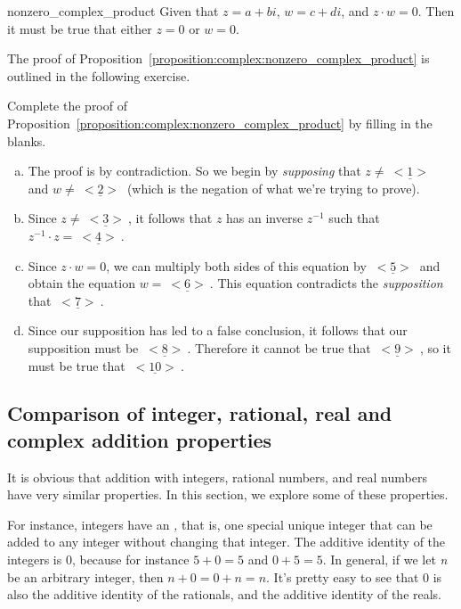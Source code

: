 \begin{prop}{nonzero_complex_product}
Given that $z = a+bi$, $w=c+di$, and $z \cdot w = 0$. Then it must be true that either $z=0$ or $w=0$.
\end{prop}
The proof of Proposition~\ref{proposition:complex:nonzero_complex_product} is outlined in the following exercise.

\begin{exercise}{12}
Complete the proof of Proposition~\ref{proposition:complex:nonzero_complex_product} by filling in the blanks.

\begin{enumerate}[(a)]
\item The proof is by contradiction. So we begin by \emph{supposing} that $z \neq  \underline{~<1>~}$  and $w \neq  \underline{~<2>~}$ (which is the negation of what we're trying to prove).
\item 
Since $z \neq  \underline{~<3>~} $, it follows that $z$ has an inverse $z^{-1}$ such that $z^{-1} \cdot z =  \underline{~<4>~}$.
\item
Since $z \cdot w = 0$, we can multiply both sides of this equation by $  \underline{~<5>~}$ and obtain the equation 
$w =  \underline{~<6>~}$. This equation contradicts the \emph{supposition} that $ \underline{~<7>~}$.
\item
Since our supposition has led to a false conclusion, it follows that our supposition must be $ \underline{~<8>~}$. Therefore it cannot be true that $ \underline{~<9>~}$, so it must be true that $ \underline{~<10>~}$.
\end{enumerate}
\end{exercise}


\subsection{Comparison of integer, rational, real and complex addition properties}

It is obvious that addition with integers, rational numbers, and
real numbers have very similar properties. In this section, we explore some of these properties.

For instance, integers have an \emph{,
}that is, one special unique integer that can be added to any integer
without changing that integer. The additive identity of the integers
is 0, because for instance $5+0=5$ and $0+5=5$. In general, if we
let \emph{n }be an arbitrary integer, then $n+0=0+n=n$. It's pretty
easy to see that 0 is also the additive identity of the rationals,
and the additive identity of the reals.

